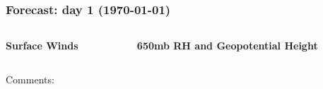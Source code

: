 \documentclass[aspectratio=169, 10pt]{beamer}
\begin{document}
\begin{frame}
\frametitle{Forecast: day 1 ({\AdvanceDate[+1]\today})}

\vspace{-.2cm}
\begin{columns}
\begin{column}{0.5\textwidth}
\begin{center}
\textbf{Surface Winds}\\
\end{center}
\end{column}

\begin{column}{0.5\textwidth}
\begin{center}
\textbf{650mb RH and Geopotential Height} \\
\end{center}
\end{column}
\end{columns}

\begin{figure}


\end{figure}


Comments:
\vspace{4cm}


\end{frame}
\end{document}
